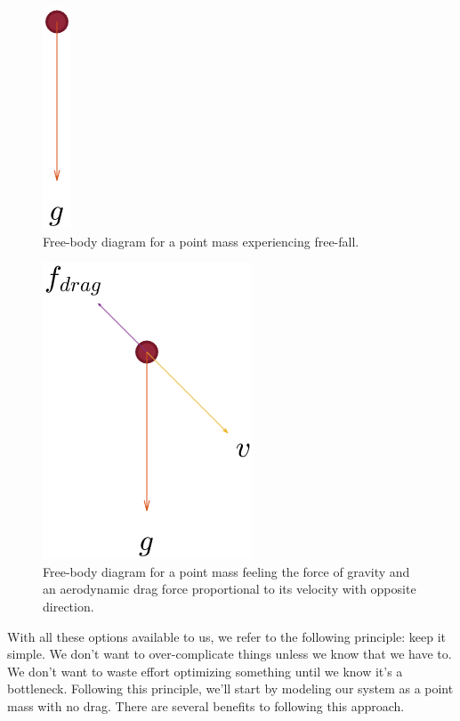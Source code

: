 \begin{figure}[t]
\centering
\includegraphics[scale=1]{images/Freebody1.png}
\caption{\label{fig:Freebody1} Free-body diagram for a point mass experiencing free-fall.}
\end{figure}

\begin{figure}[t]
\centering
\includegraphics[scale=1]{images/Freebody2.png}
\caption{\label{fig:Freebody2} Free-body diagram for a point mass feeling the force of gravity and an aerodynamic drag force proportional to its velocity with opposite direction.}
\end{figure}

With all these options available to us, we refer to the following principle: keep it simple. We don't want to over-complicate things unless we know that we have to. We don't want to waste effort optimizing something until we know it's a bottleneck. Following this principle, we'll start by modeling our system as a point mass with no drag. There are several benefits to following this approach. 

